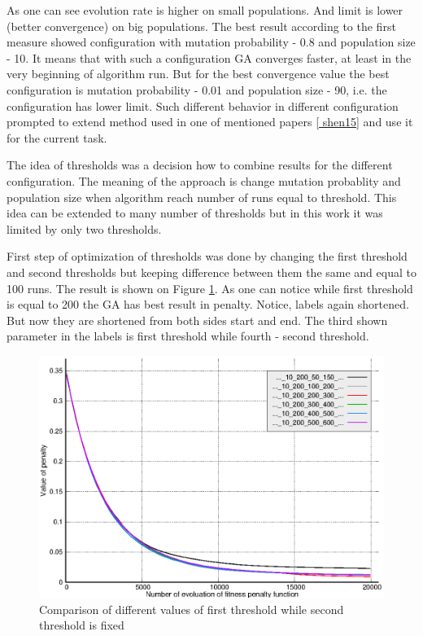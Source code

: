 \documentclass[12pt]{report}
\begin{document}
As one can see evolution rate is higher on small populations. And limit is lower (better convergence) on big populations. The best result according to the first measure showed configuration with mutation probability - 0.8 and population size - 10. It means that with such a configuration GA converges faster, at least in the very beginning of algorithm run. But for the best convergence value the best configuration is mutation probability - 0.01 and population size - 90, i.e. the configuration has lower limit. Such different behavior in different configuration prompted to extend method used in one of mentioned papers \ref{
shen15} and use it for the current task.

The idea of thresholds was a decision how to combine results for the different configuration. The meaning of the approach is change mutation probablity and population size when algorithm reach number of runs equal to threshold. This idea can be extended to many number of thresholds but in this work it was limited by only two thresholds.

First step of optimization of thresholds was done by changing the first threshold and second thresholds but keeping difference between them the same and equal to 100 runs. The result is shown on Figure \ref{threshold1comparison}. As one can notice while first threshold is equal to 200 the GA has best result in penalty. Notice, labels again shortened. But now they are shortened from both sides start and end. The third shown parameter in the labels is first threshold while fourth - second threshold.

\begin{figure}
    \centering
    \includegraphics[width=5.0in]{threshold1_comparison}
    \caption{Comparison of different values of first threshold while second threshold is fixed}
    \label{threshold1comparison}
\end{figure}
\end{document}

